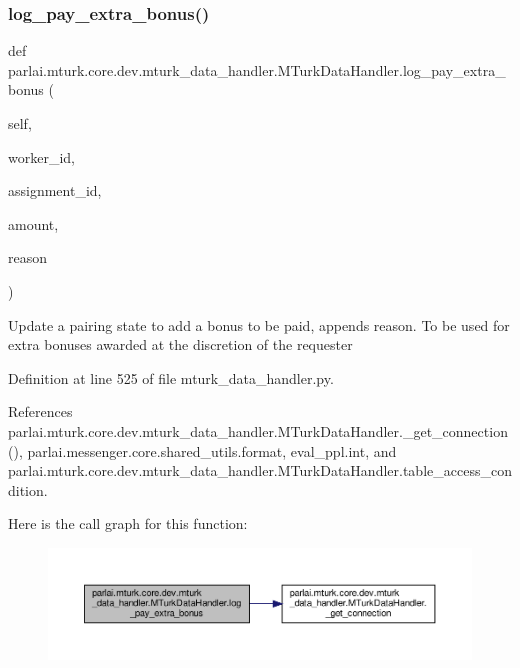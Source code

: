 \subsubsection{\texorpdfstring{log\+\_\+pay\+\_\+extra\+\_\+bonus()}{log\_pay\_extra\_bonus()}}
{\footnotesize\ttfamily def parlai.\+mturk.\+core.\+dev.\+mturk\+\_\+data\+\_\+handler.\+M\+Turk\+Data\+Handler.\+log\+\_\+pay\+\_\+extra\+\_\+bonus (\begin{DoxyParamCaption}\item[{}]{self,  }\item[{}]{worker\+\_\+id,  }\item[{}]{assignment\+\_\+id,  }\item[{}]{amount,  }\item[{}]{reason }\end{DoxyParamCaption})}

\begin{DoxyVerb}Update a pairing state to add a bonus to be paid, appends reason.
To be used for extra bonuses awarded at the discretion of the requester
\end{DoxyVerb}
 

Definition at line 525 of file mturk\+\_\+data\+\_\+handler.\+py.



References parlai.\+mturk.\+core.\+dev.\+mturk\+\_\+data\+\_\+handler.\+M\+Turk\+Data\+Handler.\+\_\+get\+\_\+connection(), parlai.\+messenger.\+core.\+shared\+\_\+utils.\+format, eval\+\_\+ppl.\+int, and parlai.\+mturk.\+core.\+dev.\+mturk\+\_\+data\+\_\+handler.\+M\+Turk\+Data\+Handler.\+table\+\_\+access\+\_\+condition.

Here is the call graph for this function\+:
\nopagebreak
\begin{figure}[H]
\begin{center}
\leavevmode
\includegraphics[width=350pt]{classparlai_1_1mturk_1_1core_1_1dev_1_1mturk__data__handler_1_1MTurkDataHandler_abf54a08cd2b503358c52229258c1f2c6_cgraph}
\end{center}
\end{figure}
\mbox{\label{classparlai_1_1mturk_1_1core_1_1dev_1_1mturk__data__handler_1_1MTurkDataHandler_afd8d5abb26cbd00f96ff7d8ad44b1f49}} 
